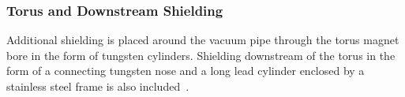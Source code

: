 \subsubsection{Torus and Downstream Shielding}

Additional shielding is placed around the vacuum pipe through the torus magnet bore in the form of tungsten cylinders.
Shielding downstream of the torus in the form of a connecting tungsten nose and a long lead cylinder enclosed
by a stainless steel frame is also included~\cite{beamline-nim}.
